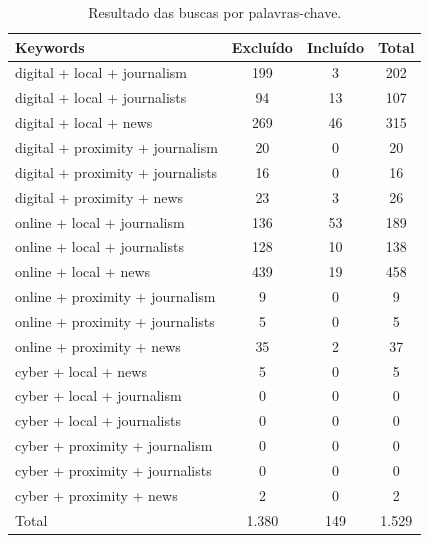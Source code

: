 \documentclass[portuguese]{textolivre}
\begin{document}
\begin{table}[h!]
\centering
\begin{threeparttable}
\caption{Resultado das buscas por palavras-chave.}\label{tab-1}
\begin{tabular}{lccc}
\toprule
Keywords & Excluído & Incluído & Total \\
\midrule
digital + local + journalism & 199 & 3  & 202 \\
digital + local + journalists & 94 & 13 & 107 \\
digital + local + news & 269 & 46 & 315 \\
digital + proximity + journalism & 20 & 0 & 20 \\
digital + proximity + journalists & 16 & 0 & 16 \\
digital + proximity + news & 23 & 3 & 26 \\
online + local + journalism & 136 & 53 & 189 \\
online + local + journalists & 128 & 10 & 138 \\
online + local + news & 439 & 19 & 458 \\
online + proximity + journalism & 9 & 0 & 9 \\
online + proximity + journalists & 5 & 0 & 5 \\
online + proximity + news & 35 & 2 & 37 \\
cyber + local + news & 5 & 0 & 5 \\
cyber + local + journalism & 0 & 0 & 0 \\
cyber + local + journalists & 0 & 0 & 0 \\
cyber + proximity + journalism & 0 & 0 & 0 \\
cyber + proximity + journalists & 0 & 0 & 0 \\
cyber + proximity + news & 2 & 0 & 2 \\
\addlinespace[0.3em]
Total & 1.380 & 149 & 1.529 \\
\bottomrule
\end{tabular}
\end{threeparttable}
\end{table}
\end{document}
